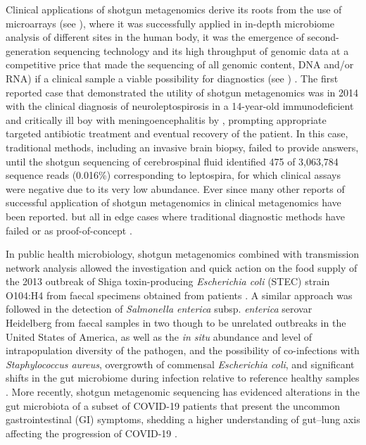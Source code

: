 Clinical applications of shotgun metagenomics derive its roots from the use of microarrays (see ), where it was successfully applied in in-depth microbiome analysis of different sites in the human body, it was the emergence of second-generation sequencing technology and its high throughput of genomic data at a competitive price that made the sequencing of all genomic content, DNA and/or RNA) if a clinical sample a viable possibility for diagnostics (see ) \citep{miller_basic_2009, palmer_rapid_2006, chiu_clinical_2019}. The first reported case that demonstrated the utility of shotgun metagenomics was in 2014 with the clinical diagnosis of neuroleptospirosis in a 14-year-old immunodeficient and critically ill boy with meningoencephalitis by \cite{wilson_actionable_2014}, prompting appropriate targeted antibiotic treatment and eventual recovery of the patient. In this case, traditional methods, including an invasive brain biopsy, failed to provide answers, until the shotgun sequencing of cerebrospinal fluid identified 475 of 3,063,784 sequence reads (0.016\%) corresponding to leptospira, for which clinical assays were negative due to its very low abundance. Ever since many other reports of successful application of shotgun metagenomics in clinical metagenomics have been reported. but all in edge cases where traditional diagnostic methods have failed or as proof-of-concept \citep{couto_critical_2018, vijayvargiya_application_2019, sanabria_shotgun-metagenomics_2020, hirakata_application_2021}. 

In public health microbiology, shotgun metagenomics combined with transmission network analysis allowed the investigation and quick action on the food supply of the 2013 outbreak of Shiga toxin-producing \textit{Escherichia coli} (STEC) strain O104:H4 from faecal specimens obtained from patients \citep{loman_culture-independent_2013}. A similar approach was followed in the detection of \textit{Salmonella enterica} subsp. \textit{enterica} serovar Heidelberg from faecal samples in two though to be unrelated outbreaks in the United States of America, as well as the \textit{in situ} abundance and level of intrapopulation diversity of the pathogen, and the possibility of co-infections with \textit{Staphylococcus aureus}, overgrowth of commensal \textit{Escherichia coli}, and significant shifts in the gut microbiome during infection relative to reference healthy samples \citep{huang_metagenomics_2017}. More recently, shotgun metagenomic sequencing has evidenced alterations in the gut microbiota of a subset of COVID-19 patients that present the uncommon gastrointestinal (GI) symptoms, shedding a higher understanding of gut–lung axis affecting the progression of COVID-19 \citep{li_microbiome_2021}.

